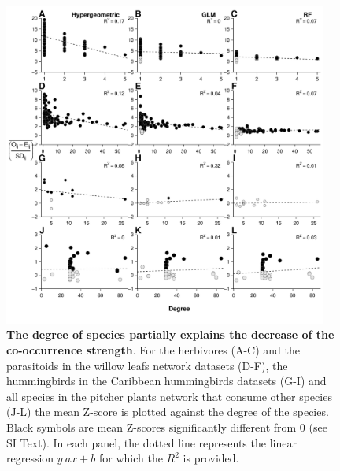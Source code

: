 \begin{figure}
\centering
\includegraphics[width=0.95000\textwidth]{chapitre3/figS7.pdf}
\caption{\textbf{The degree of species partially explains the decrease
of the co-occurrence strength}. For the herbivores (A-C) and the
parasitoids in the willow leafs network datasets (D-F), the hummingbirds
in the Caribbean hummingbirds datasets (G-I) and all species in the
pitcher plants network that consume other species (J-L) the mean Z-score
is plotted against the degree of the species. Black symbols are mean
Z-scores significantly different from 0 (see SI Text). In each panel,
the dotted line represents the linear regression \(y~ax+b\) for which
the \(R^2\) is provided.\label{fig:degree}}
\end{figure}

\newpage


